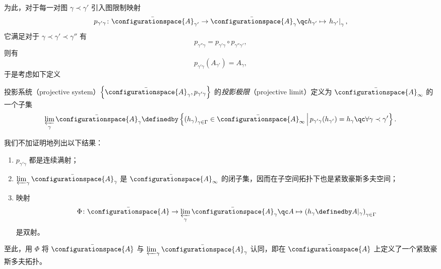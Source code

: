 			为此，对于每一对图 $\gamma \prec \gamma'$ 引入图限制映射
			\begin{equation}
				p_{\gamma' \gamma} \colon \bar{\configurationspace{A}}_{\gamma'} \rightarrow \bar{\configurationspace{A}}_\gamma \qc h_{\gamma'} \mapsto \left.h_{\gamma'}\right|_{\gamma},
			\end{equation}
			它满足对于 $\gamma \prec \gamma' \prec 	\gamma''$ 有
			\begin{equation}
				p_{\gamma'' \gamma} = p_{\gamma' \gamma} \circ p_{\gamma'' \gamma'},
			\end{equation}
			则有
			\begin{equation}
				p_{\gamma' \gamma}\left( A_{\gamma'} \right) = A_\gamma,
			\end{equation}
			于是考虑如下定义
			\begin{Definition}
				投影系统（projective system）$\left\{ \bar{\configurationspace{A}}_\gamma, p_{\gamma' \gamma} \right\}$ 的\emph{投影极限}（projective limit）定义为 $\bar{\configurationspace{A}}_\infty$ 的一个子集
				\begin{equation}
					\varprojlim_{\gamma} \bar{\configurationspace{A}}_\gamma \definedby \left\{ {\left( h_\gamma \right)}_{\gamma \in \Gamma} \in \bar{\configurationspace{A}}_{\infty} \,\middle\vert\, p_{\gamma' \gamma}(h_{\gamma'}) = h_\gamma\qc \forall \gamma \prec \gamma' \right\}.
				\end{equation}
			\end{Definition}
			我们不加证明地列出以下结果：
			\begin{Property}
				\begin{enumerate}
					\item $p_{\gamma' \gamma}$ 都是连续满射；
					\item $\varprojlim_{\gamma} \bar{\configurationspace{A}}_\gamma$ 是 $\bar{\configurationspace{A}}_\infty$ 的闭子集，因而在子空间拓扑下也是紧致豪斯多夫空间；
					\item 映射
					\begin{equation}
						\Phi \colon \bar{\configurationspace{A}} \rightarrow \varprojlim_{\gamma} \bar{\configurationspace{A}}_\gamma \qc A \mapsto {\left( h_\gamma \definedby A|_\gamma \right)}_{\gamma \in \Gamma}
					\end{equation}
					是双射。
				\end{enumerate}
			\end{Property}
			至此，用 $\Phi$ 将 $\bar{\configurationspace{A}}$ 与 $\varprojlim_{\gamma} \bar{\configurationspace{A}}_\gamma$ 认同，即在 $\bar{\configurationspace{A}}$ 上定义了一个紧致豪斯多夫拓扑。

